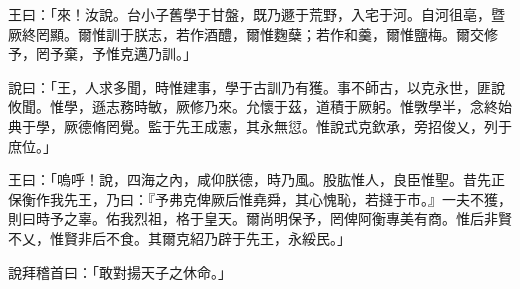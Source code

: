 
\begin{pinyinscope}
王曰：「來！汝說。台小子舊學于甘盤，既乃遯于荒野，入宅于河。自河徂亳，暨厥終罔顯。爾惟訓于朕志，若作酒醴，爾惟麴蘖；若作和羹，爾惟鹽梅。爾交修予，罔予棄，予惟克邁乃訓。」

說曰：「王，人求多聞，時惟建事，學于古訓乃有獲。事不師古，以克永世，匪說攸聞。惟學，遜志務時敏，厥修乃來。允懷于茲，道積于厥躬。惟斆學半，念終始典于學，厥德脩罔覺。監于先王成憲，其永無愆。惟說式克欽承，旁招俊乂，列于庶位。」

王曰：「嗚呼！說，四海之內，咸仰朕德，時乃風。股肱惟人，良臣惟聖。昔先正保衡作我先王，乃曰：『予弗克俾厥后惟堯舜，其心愧恥，若撻于市。』一夫不獲，則曰時予之辜。佑我烈祖，格于皇天。爾尚明保予，罔俾阿衡專美有商。惟后非賢不乂，惟賢非后不食。其爾克紹乃辟于先王，永綏民。」

說拜稽首曰：「敢對揚天子之休命。」


\end{pinyinscope}